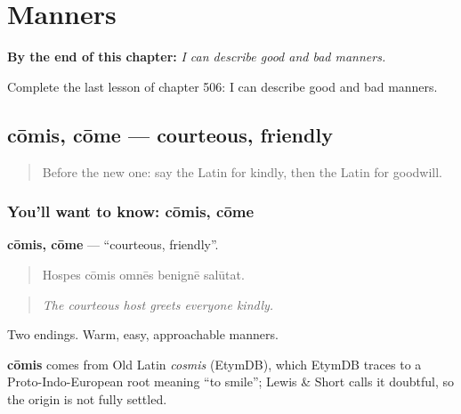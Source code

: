 
\chapter{Manners}
\label{ch:la-manners}

\begin{chapteropening}
\textbf{By the end of this chapter:} \emph{I can describe good and bad manners.}

Complete the last lesson of chapter 506: I can describe good and bad manners.
\end{chapteropening}

\section[cōmis, cōme]{cōmis, cōme — courteous, friendly}

\label{lesson:LA-C506-comis}



\begin{quote}
Before the new one: say the Latin for kindly, then the Latin for goodwill.
\end{quote}

\subsection*{You'll want to know: cōmis, cōme}
\textbf{cōmis, cōme} — \textquotedblleft{}courteous, friendly\textquotedblright{}.

\begin{quote}
Hospes cōmis omnēs benignē salūtat.
\end{quote}

\begin{quote}
\emph{The courteous host greets everyone kindly.}
\end{quote}

Two endings. Warm, easy, approachable manners.

\begin{cousinweb}
\textbf{cōmis} comes from Old Latin \emph{cosmis} (EtymDB), which EtymDB traces to a Proto-Indo-European root meaning \textquotedblleft{}to smile\textquotedblright{}; Lewis \& Short calls it doubtful, so the origin is not fully settled.
\end{cousinweb}

